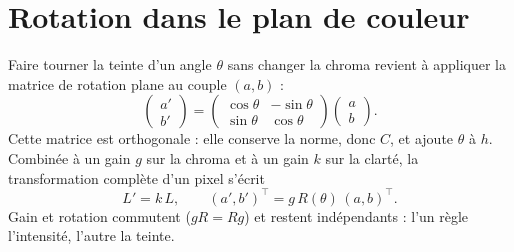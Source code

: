 
\section{Rotation dans le plan de couleur}
Faire tourner la teinte d'un angle $\theta$ sans changer la chroma revient à
appliquer la matrice de rotation plane au couple $(a,b)$ :
\begin{equation}
\begin{pmatrix}a'\\ b'\end{pmatrix}=
\begin{pmatrix}\cos\theta & -\sin\theta\\ \sin\theta & \cos\theta\end{pmatrix}
\begin{pmatrix}a\\ b\end{pmatrix}.
\end{equation}
Cette matrice est orthogonale : elle conserve la norme, donc $C$, et ajoute
$\theta$ à $h$. Combinée à un gain $g$ sur la chroma et à un gain $k$ sur la
clarté, la transformation complète d'un pixel s'écrit
\begin{equation}
L'=k\,L,\qquad (a',b')^\top = g\,R(\theta)\,(a,b)^\top .
\label{eq:transformation}
\end{equation}
Gain et rotation commutent ($gR=Rg$) et restent indépendants : l'un règle
l'intensité, l'autre la teinte.


